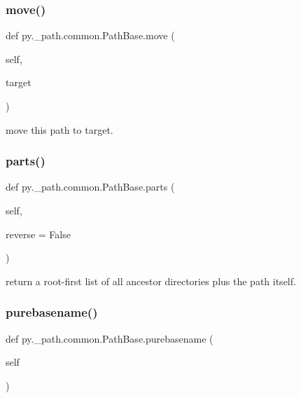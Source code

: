 \subsubsection{\texorpdfstring{move()}{move()}}
{\footnotesize\ttfamily def py.\+\_\+path.\+common.\+Path\+Base.\+move (\begin{DoxyParamCaption}\item[{}]{self,  }\item[{}]{target }\end{DoxyParamCaption})}

\begin{DoxyVerb}move this path to target. \end{DoxyVerb}
 \mbox{\label{classpy_1_1__path_1_1common_1_1_path_base_a799edfd96b4e8ff890d395287fd272f5}} 
\subsubsection{\texorpdfstring{parts()}{parts()}}
{\footnotesize\ttfamily def py.\+\_\+path.\+common.\+Path\+Base.\+parts (\begin{DoxyParamCaption}\item[{}]{self,  }\item[{}]{reverse = {\ttfamily False} }\end{DoxyParamCaption})}

\begin{DoxyVerb}return a root-first list of all ancestor directories
    plus the path itself.
\end{DoxyVerb}
 \mbox{\label{classpy_1_1__path_1_1common_1_1_path_base_a0f5564d9257d7dfb42ace20f74899d01}} 
\subsubsection{\texorpdfstring{purebasename()}{purebasename()}}
{\footnotesize\ttfamily def py.\+\_\+path.\+common.\+Path\+Base.\+purebasename (\begin{DoxyParamCaption}\item[{}]{self }\end{DoxyParamCaption})}

